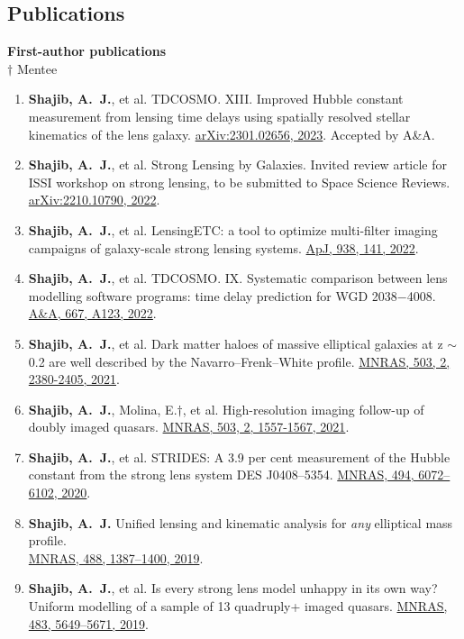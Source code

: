 \documentclass[margin, line]{res}
\begin{document}
\begin{resume}
\section{\sc Publications}
\textbf{First-author publications}
\\ $\dagger$ Mentee
\begin{enumerate}
	\item \textbf{Shajib, A.~J.}, et al. TDCOSMO. XIII. Improved Hubble constant measurement from lensing time delays using spatially resolved stellar kinematics of the lens galaxy. \href{https://ui.adsabs.harvard.edu/abs/2023arXiv230102656S/abstract}{arXiv:2301.02656, 2023}. Accepted by A\&A.
	\item \textbf{Shajib, A.~J.}, et al. Strong Lensing by Galaxies. Invited review article for ISSI workshop on strong lensing, to be submitted to Space Science Reviews. \href{https://arxiv.org/abs/2210.10790}{arXiv:2210.10790, 2022}.
	\item \textbf{Shajib, A.~J.}, et al. LensingETC: a tool to optimize multi-filter imaging campaigns of galaxy-scale strong lensing systems. \href{https://doi.org/10.3847/1538-4357/ac927b}{ApJ, 938, 141, 2022}.
	\item \textbf{Shajib, A.~J.}, et al. TDCOSMO. IX. Systematic comparison between lens modelling software programs: time delay prediction for WGD 2038$-$4008. \href{https://arxiv.org/abs/2202.11101}{A\&A, 667, A123, 2022}.
	\item \textbf{Shajib, A.~J.}, et al. Dark matter haloes of massive elliptical galaxies at z $\sim$ 0.2 are well described by the Navarro--Frenk--White profile. \href{https://doi.org/10.1093/mnras/stab536}{MNRAS, 503, 2, 2380-2405, 2021}.
	\item \textbf{Shajib, A.~J.}, Molina, E.{$\dagger$}, et al. High-resolution imaging follow-up of doubly imaged quasars. \href{https://doi:10.1093/mnras/stab532}{MNRAS, 503, 2, 1557-1567, 2021}.
	\item \textbf{Shajib, A.~J.}, et al. STRIDES: A 3.9 per cent measurement of the Hubble constant from the strong lens system DES J0408--5354. \href{https://academic.oup.com/mnras/advance-article-abstract/doi/10.1093/mnras/staa828/5813265}{MNRAS, 494, 6072--6102, 2020}.
	\item \textbf{Shajib, A.~J.} Unified lensing and kinematic analysis for \textit{any} elliptical mass profile. \\ \href{https://doi.org/10.1093/mnras/stz1796}{MNRAS, 488, 1387--1400, 2019}.
	\item \textbf{Shajib, A.~J.}, et al. Is every strong lens model unhappy in its own way? Uniform modelling of a sample of 13 quadruply+ imaged quasars. \href{https://doi.org/10.1093/mnras/sty3397}{MNRAS, 483, 5649--5671, 2019}.

\end{enumerate}
\end{resume}
\end{document}
